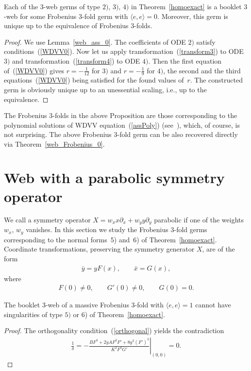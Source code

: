 \documentclass[pdftex]{sigma}
\begin{document}
\begin{proposition}
Each of the $3$-web germs of type $2)$, $3)$, $4)$
in Theorem~{\rm \ref{homoexact}} is a booklet $3$-web for some Frobenius $3$-fold germ
with $\langle e,e\rangle =0$. Moreover, this germ is unique up to the equivalence of Frobenius $3$-folds.
\end{proposition}
\begin{proof} We use Lemma~\ref{web_ass_0}. The coef\/f\/icients of ODE $2)$ satisfy conditions~(\ref{WDVV0}).
Now let us apply transformation~(\ref{transform3}) to ODE $3)$ and transformation~(\ref{transform4}) to ODE $4)$.
Then the f\/irst equation of~(\ref{WDVV0}) gives $r=-\frac{1}{12}$ for $3)$ and $r=-\frac{1}{9}$ for $4)$,
the second and the third equations~(\ref{WDVV0}) being satisf\/ied for the found values of~$r$.
The constructed germ is obviously unique up to an unessential scaling, i.e., up to the equivalence.
\end{proof}
\begin{remark}
The Frobenius $3$-folds in the above Proposition are those corresponding to the polynomial solutions of WDVV equation~(\ref{assPoly}) (see~\cite{Df}), which, of course, is not surprising. The above Frobenius $3$-fold germ can be also recovered directly via Theorem~\ref{web_Frobenius_0}.
\end{remark}

\section{Web with a parabolic symmetry operator}
We call a symmetry operator $X=w_xx\partial_x+w_yy\partial_y$ parabolic if one of the weights $w_x$, $w_y$ vanishes.
In this section we study the Frobenius $3$-fold germs corresponding to the normal forms~5) and~6)
of Theorem~\ref{homoexact}.
Coordinate transformations, preserving the symmetry generator $X$, are of the form
\begin{gather*}%
\bar{y}=yF(x), \qquad \bar{x}=G(x),
\end{gather*}
where
\begin{gather*}
F(0)\ne 0, \qquad G'(0)\ne 0, \qquad G(0)=0.
\end{gather*}

\begin{proposition}
The booklet $3$-web of a massive Frobenius $3$-fold with $\langle e,e\rangle =1$
cannot have singularities of type $5)$ or {\rm 6)} of Theorem~{\rm\ref{homoexact}}.
\end{proposition}
\begin{proof}
The orthogonality condition~(\ref{orthogonal}) yields the contradiction
\begin{gather*}
\frac{1}{\delta}=\left.-\frac{BF^3+2yAF^2 F'+8y^3(F')^3}{K^2F^4G'}\right|_{(0,0)}=0.\tag*{\qed}
\end{gather*}
\renewcommand{\qed}{}
\end{proof}
\end{document}
